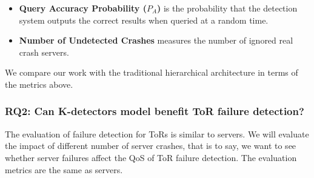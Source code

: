 \documentclass{sig-alternate-05-2015}
\begin{document}
\begin{itemize}
  \item \textbf{Query Accuracy Probability ($P_A$)} is the probability that the detection system outputs the correct results when queried at a random time.

  \item \textbf{Number of Undetected Crashes} measures the number of ignored real crash servers.
\end{itemize}

We compare our work with the traditional hierarchical architecture \cite{felber1999failure} in terms of the metrics above.

\subsubsection*{RQ2: Can K-detectors model benefit ToR failure detection?}
\quad The evaluation of failure detection for ToRs is similar to servers. We will evaluate the impact of different number of server crashes, that is to say, we want to see whether server failures affect the QoS of ToR failure detection. The evaluation metrics are the same as servers.
\end{document}
